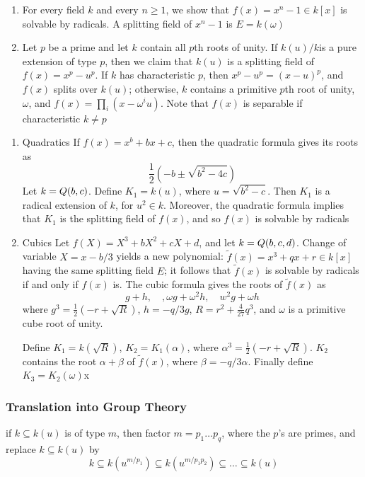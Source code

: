 \documentclass[11pt]{article}
\begin{document}
\begin{examplle}[]
\label{nexample3.15}
\begin{enumerate}
\item For every field \(k\) and every \(n\ge1\), we show that 
\(f(x)=x^n-1\in k[x]\) is solvable by radicals. A splitting field of
\(x^n-1\) is \(E=k(\omega)\)
\item Let \(p\) be a prime and let \(k\) contain all \(p\)th roots of unity. If
\(k(u)/k\)is a pure extension of type \(p\), then we claim that \(k(u)\) is
a splitting field of \(f(x)=x^p-u^p\). If \(k\) has characteristic \(p\),
then \(x^p-u^p=(x-u)^p\), and \(f(x)\) splits over \(k(u)\); otherwise,
\(k\) contains a primitive \(p\)th root of unity, \(\omega\), and
\(f(x)=\prod_i(x-\omega^iu)\). Note that \(f(x)\) is separable if
characteristic \(k\neq p\)
\end{enumerate}
\end{examplle}
\begin{enumerate}
\item Quadratics
\label{sec:org756d739}
If \(f(x)=x^b+bx+c\), then the quadratic formula gives its roots as
\begin{equation*}
\frac{1}{2}(-b\pm\sqrt{b^2-4c})
\end{equation*}
Let \(k=\relax{Q}(b,c)\). Define \(K_1=k(u)\), where \(u=\sqrt{b^2-c}\). Then
\(K_1\) is a radical extension of \(k\), for \(u^2\in k\). Moreover, the
quadratic formula implies that \(K_1\) is the splitting field of \(f(x)\),
and so \(f(x)\) is solvable by radicals
\item Cubics
\label{sec:org803bf6b}
Let \(f(X)=X^3+bX^2+cX+d\), and let \(k=\relax{Q}(b,c,d)\). Change of variable
\(X=x-b/3\) yields a new polynomial: \(\widetilde{f}(x)=x^3+qx+r\in k[x]\)
having the same splitting field \(E\); it follows that \(\widetilde{f}(x)\)
is solvable by radicals if and only if \(f(x)\) is. The cubic formula gives
the roots of \(\widetilde{f}(x)\) as
\begin{equation*}
g+h,\quad,\omega g+\omega^2h,\quad w^2g+\omega h
\end{equation*}
where \(g^3=\frac{1}{2}(-r+\sqrt{R})\), \(h=-q/3g\),
\(R=r^2+\frac{4}{27}q^3\), and \(\omega\) is a primitive cube root of unity.

Define \(K_1=k(\sqrt{R})\), \(K_2=K_1(\alpha)\), where
\(\alpha^3=\frac{1}{2}(-r+\sqrt{R})\). \(K_2\) contains the root
\(\alpha+\beta\) of \(\widetilde{f}(x)\), where \(\beta=-q/3\alpha\).
Finally define \(K_3=K_2(\omega)\)x
\end{enumerate}
\subsubsection{Translation into Group Theory}
\label{sec:org5e43415}
if \(k\subseteq k(u)\) is of type \(m\), then factor \(m=p_1\dots p_q\), where
the \(p\)'s are primes, and replace \(k\subseteq k(u)\) by
\begin{equation*}
k\subseteq k(u^{m/p_1})\subseteq k(u^{m/p_1p_2})\subseteq\dots\subseteq
k(u)
\end{equation*}
\end{document}
